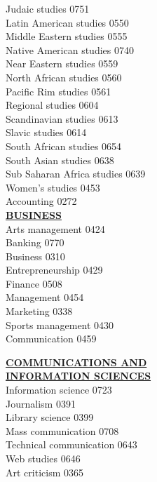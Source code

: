 \documentclass[9pt,twoside]{article}
\newcommand{\categoryheading}[1]{{\fontsize{8}{11}\selectfont \textbf{\uline{#1}}}}
\begin{document}
\begin{multicols}{3}
Judaic studies \hfill 0751 \leavevmode \\
Latin American studies \hfill 0550 \leavevmode \\
Middle Eastern studies \hfill 0555 \leavevmode \\
Native American studies \hfill 0740 \leavevmode \\
Near Eastern studies \hfill 0559 \leavevmode \\
North African studies \hfill 0560 \leavevmode \\
Pacific Rim studies \hfill 0561 \leavevmode \\
Regional studies \hfill 0604 \leavevmode \\
Scandinavian studies \hfill 0613 \leavevmode \\
Slavic studies \hfill 0614 \leavevmode \\
South African studies \hfill 0654 \leavevmode \\
South Asian studies \hfill 0638 \leavevmode \\
Sub Saharan Africa studies \hfill 0639 \leavevmode \\
Women's studies \hfill 0453 \leavevmode \\
Accounting \hfill 0272 \leavevmode \\
\columnbreak
\categoryheading{BUSINESS} \leavevmode \\
Arts management \hfill 0424 \leavevmode \\
Banking \hfill 0770 \leavevmode \\
Business \hfill 0310 \leavevmode \\
Entrepreneurship \hfill 0429 \leavevmode \\
Finance \hfill 0508 \leavevmode \\
Management \hfill 0454 \leavevmode \\
Marketing \hfill 0338 \leavevmode \\
Sports management \hfill 0430 \leavevmode \\
Communication \hfill 0459

\categoryheading{COMMUNICATIONS AND \leavevmode \\
INFORMATION SCIENCES} \leavevmode \\
Information science \hfill 0723 \leavevmode \\
Journalism \hfill 0391 \leavevmode \\
Library science \hfill 0399 \leavevmode \\
Mass communication \hfill 0708 \leavevmode \\
Technical communication \hfill 0643 \leavevmode \\
Web studies \hfill 0646 \leavevmode \\
Art criticism \hfill 0365


\end{multicols}
\end{document}
